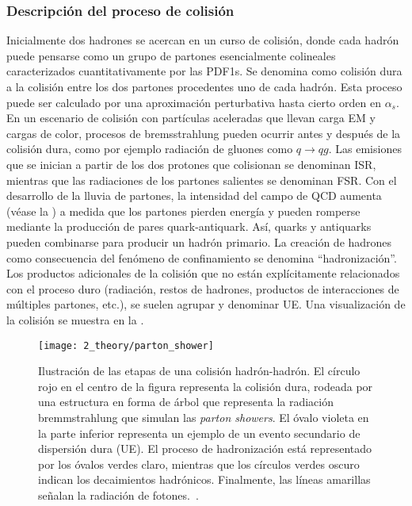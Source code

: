 \subsubsection{Descripción del proceso de colisión}

Inicialmente dos hadrones se acercan en un curso de colisión, donde cada hadrón puede pensarse como un grupo de partones esencialmente colineales caracterizados cuantitativamente por las \acp{PDF1}.
Se denomina como colisión dura a la colisión entre los dos partones procedentes uno de cada hadrón. Esta proceso puede ser calculado por una aproximación perturbativa hasta cierto orden en \(\alpha_s\).
En un escenario de colisión con partículas aceleradas que llevan carga \ac{EM} y cargas de color, procesos de bremsstrahlung pueden ocurrir antes y después de la colisión dura, como por ejemplo radiación de gluones como \(q \to qg\).
Las emisiones que se inician a partir de los dos protones que colisionan se denominan \ac{ISR}, mientras que las radiaciones de los partones salientes se denominan \ac{FSR}. Con el desarrollo de la lluvia de partones, la intensidad del campo de \ac{QCD} aumenta (véase la \Fig{\ref{fig:theory:sm:mathematical:qcd:alphas}}) a medida que los partones pierden energía y pueden romperse mediante la producción de pares quark-antiquark. Así, quarks y antiquarks pueden combinarse para producir un hadrón primario. La creación de hadrones como consecuencia del fenómeno de confinamiento se denomina \enquote{hadronización}. Los productos adicionales de la colisión que no están explícitamente relacionados con el proceso duro (radiación, restos de hadrones, productos de interacciones de múltiples partones, etc.), se suelen agrupar y denominar \ac{UE}. Una visualización de la colisión \pp se muestra en la \Fig{\ref{fig:theory:sm:hadron_interactions:parton_shower}}.



\begin{figure}[ht!]
    \centering
    \texttt{[image: 2\_theory/parton\_shower]}
    \caption{Ilustración de las etapas de una colisión hadrón-hadrón. El círculo rojo en el centro de la figura representa la colisión dura, rodeada por una estructura en forma de árbol que representa la radiación bremmstrahlung que simulan las \textit{parton showers}. El óvalo violeta en la parte inferior representa un ejemplo de un evento secundario de dispersión dura (\ac{UE}). El proceso de hadronización está representado por los óvalos verdes claro, mientras que los círculos verdes oscuro indican los decaimientos hadrónicos. Finalmente, las líneas amarillas señalan la radiación de fotones.~\cite{Hoche-2015}.}
    \label{fig:theory:sm:hadron_interactions:parton_shower}
\end{figure}



